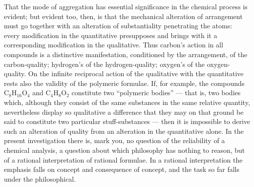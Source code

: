 \documentclass[12pt,a4paper]{book}
\begin{document}
That the mode of aggregation has essential significance in the chemical process
is evident; but evident too, then, is that the mechanical alteration of
arrangement must go together with an alteration of substantiality penetrating
the atoms: every modification in the quantitative presupposes and brings with
it a corresponding modification in the qualitative. Thus carbon's action in all
compounds is a distinctive manifestation, conditioned by the arrangement, of
the carbon-quality; hydrogen's of the hydrogen-quality; oxygen's of the
oxygen-quality. On the infinite reciprocal action of the qualitative with the
quantitative rests also the validity of the polymeric formulae. If, for
example, the compounds $\mathrm{C}_8\mathrm{H}_{16}\mathrm{O}_4$ and
$\mathrm{C}_4\mathrm{H}_8\mathrm{O}_2$ constitute two ``polymeric
bodies'' --- that is, two bodies which, although they consist of the same
substances in the same relative quantity, nevertheless display so qualitative a
difference that they may on that ground be said to constitute two particular
stuff-substances --- then it is impossible to derive such an alteration of
quality from an alteration in the quantitative alone. In the present
investigation there is, mark you, no question of the reliability of a chemical
analysis, a question about which philosophy has nothing to reason, but of a
rational interpretation of rational formulae. In a rational interpretation the
emphasis falls on concept and consequence of concept, and the task so far
falls under the philosophical.
\end{document}
